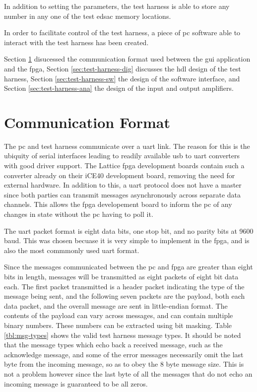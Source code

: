 In addition to setting the parameters, the test harness is able to store any number in any one of the test \gls{edsac} memory locations.

In order to facilitate control of the test harness, a piece of \gls{pc} software able to interact with the test harness has been created.

Section \ref{sec:test-harness-comms} disucessed the communication format used between the \gls{gui} application and the \gls{fpga}, Section \ref{sec:test-harness-dig} discusses the \gls{hdl} design of the test harness, Section \ref{sec:test-harness-sw} the design of the software interface, and Section \ref{sec:test-harness-ana} the design of the input and output amplifiers.

\section{Communication Format} \label{sec:test-harness-comms}
The \gls{pc} and test harness communicate over a \gls{uart} link. The reason for this is the ubiquity of serial interfaces leading to readily available \gls{usb} to \gls{uart} converters with good driver support. The Lattice \gls{fpga} development boards contain such a converter already on their iCE40 development board, removing the need for external hardware. In addition to this, a \gls{uart} protocol does not have a master since both parties can transmit messages asynchronously across separate data channels. This allows the \gls{fpga} developement board to inform the \gls{pc} of any changes in state without the \gls{pc} having to poll it.

The \gls{uart} packet format is eight data bits, one stop bit, and no parity bits at 9600 baud. This was chosen becuase it is very simple to implement in the \gls{fpga}, and is also the most commmonly used \gls{uart} format.

Since the messages communicated between the \gls{pc} and \gls{fpga} are greater than eight bits in length, messages will be transmitted as eight packets of eight bit data each. The first packet transmitted is a header packet indicating the type of the message being sent, and the following seven packets are the payload, both each data packet, and the overall message are sent in little-endian format. The contents of the payload can vary across messages, and can contain multiple binary numbers. These numbers can be extracted using bit masking. Table \ref{tbl:msg-types} shows the valid test harness message types. It should be noted that the message types which echo back a received message, such as the acknowledge message, and some of the error messages necessarily omit the last byte from the incoming message, so as to obey the 8 byte message size. This is not a problem however since the last byte of all the messages that do not echo an incoming message is guaranteed to be all zeros.


